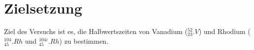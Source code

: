 
\section{Zielsetzung}
\label{sec:Zielsetzung}

Ziel des Versuchs ist es, die Halbwertszeiten von Vanadium ($^{52}_{23}.V$) und Rhodium ($^{104}_{45}.{Rh}$ und $^{104i}_{45}.{Rh}$) zu bestimmen.

